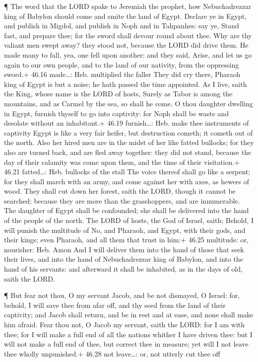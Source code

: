  ¶ The word that the LORD spake to Jeremiah the prophet,
how Nebuchadrezzar king of Babylon should come and smite the land of
Egypt.  Declare ye in Egypt, and publish in Migdol, and
publish in Noph and in Tahpanhes: say ye, Stand fast, and prepare thee;
for the sword shall devour round about thee.  Why are thy
valiant men swept away? they stood not, because the LORD did drive them.
 He made many to fall, yea, one fell upon another: and they
said, Arise, and let us go again to our own people, and to the land of
our nativity, from the oppressing sword.+ 46.16 made\ldots: Heb.
multiplied the faller  They did cry there, Pharaoh king of
Egypt is but a noise; he hath passed the time appointed. 
As I live, saith the King, whose name is the LORD of hosts, Surely as
Tabor is among the mountains, and as Carmel by the sea, so shall he
come.  O thou daughter dwelling in Egypt, furnish thyself
to go into captivity: for Noph shall be waste and desolate without an
inhabitant.+ 46.19 furnish\ldots: Heb. make thee instruments of
captivity  Egypt is like a very fair heifer, but
destruction cometh; it cometh out of the north.  Also her
hired men are in the midst of her like fatted bullocks; for they also
are turned back, and are fled away together: they did not stand, because
the day of their calamity was come upon them, and the time of their
visitation.+ 46.21 fatted\ldots: Heb. bullocks of the stall
 The voice thereof shall go like a serpent; for they shall
march with an army, and come against her with axes, as hewers of wood.
 They shall cut down her forest, saith the LORD, though it
cannot be searched; because they are more than the grasshoppers, and are
innumerable.  The daughter of Egypt shall be confounded;
she shall be delivered into the hand of the people of the north.
 The LORD of hosts, the God of Israel, saith; Behold, I
will punish the multitude of No, and Pharaoh, and Egypt, with their
gods, and their kings; even Pharaoh, and all them that trust in him:+
46.25 multitude: or, nourisher: Heb. Amon  And I will
deliver them into the hand of those that seek their lives, and into the
hand of Nebuchadrezzar king of Babylon, and into the hand of his
servants: and afterward it shall be inhabited, as in the days of old,
saith the LORD.

 ¶ But fear not thou, O my servant Jacob, and be not
dismayed, O Israel: for, behold, I will save thee from afar off, and thy
seed from the land of their captivity; and Jacob shall return, and be in
rest and at ease, and none shall make him afraid.  Fear
thou not, O Jacob my servant, saith the LORD: for I am with thee; for I
will make a full end of all the nations whither I have driven thee: but
I will not make a full end of thee, but correct thee in measure; yet
will I not leave thee wholly unpunished.+ 46.28 not leave\ldots: or, not
utterly cut thee off


